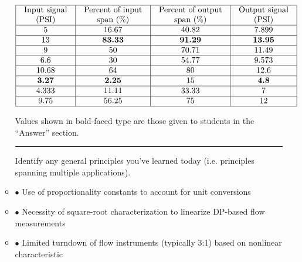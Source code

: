 \begin{itemize}
\begin{itemize}
$$\vbox{\offinterlineskip
\halign{\strut
\vrule \quad\hfil # \ \hfil & 
\vrule \quad\hfil # \ \hfil & 
\vrule \quad\hfil # \ \hfil & 
\vrule \quad\hfil # \ \hfil \vrule \cr
\noalign{\hrule}
%
Input signal & Percent of input & Percent of output & Output signal \cr
%
(PSI) & span (\%) & span (\%) & (PSI) \cr
%
\noalign{\hrule}
%
5 & 16.67 & 40.82 & 7.899 \cr
%
\noalign{\hrule}
%
13 & {\bf 83.33} & {\bf 91.29} & {\bf 13.95} \cr
%
\noalign{\hrule}
%
9 & 50 & 70.71 & 11.49 \cr
%
\noalign{\hrule}
%
6.6 & 30 & 54.77 & 9.573 \cr
%
\noalign{\hrule}
%
10.68 & 64 & 80 & 12.6 \cr
%
\noalign{\hrule}
%
{\bf 3.27} & {\bf 2.25} & 15 & {\bf 4.8} \cr
%
\noalign{\hrule}
%
4.333 & 11.11 & 33.33 & 7 \cr
%
\noalign{\hrule}
%
9.75 & 56.25 & 75 & 12 \cr
%
\noalign{\hrule}
} %
}$$ %

Values shown in bold-faced type are those given to students in the ``Answer'' section.


\filbreak \vskip 5pt \hrule \vskip 5pt  \vskip 10pt

\noindent
Identify any general principles you've learned today (i.e. principles spanning multiple applications).
\item{$\bullet$} Use of proportionality constants to account for unit conversions
\item{$\bullet$} Necessity of square-root characterization to linearize DP-based flow measurements
\item{$\bullet$} Limited turndown of flow instruments (typically 3:1) based on nonlinear characteristic
\medskip


\end{itemize}
\end{itemize}

